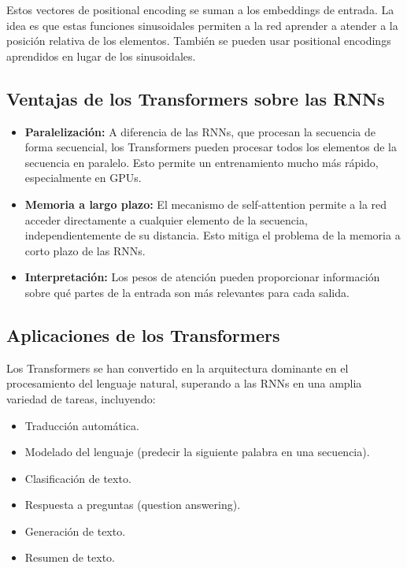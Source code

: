 \documentclass{article}
\begin{document}
Estos vectores de positional encoding se suman a los embeddings de entrada.  La idea es que estas funciones sinusoidales permiten a la red aprender a atender a la posición relativa de los elementos.  También se pueden usar positional encodings aprendidos en lugar de los sinusoidales.

\subsection{Ventajas de los Transformers sobre las RNNs}

\begin{itemize}
    \item \textbf{Paralelización:}  A diferencia de las RNNs, que procesan la secuencia de forma secuencial, los Transformers pueden procesar todos los elementos de la secuencia en paralelo.  Esto permite un entrenamiento mucho más rápido, especialmente en GPUs.
    \item \textbf{Memoria a largo plazo:}  El mecanismo de self-attention permite a la red acceder directamente a cualquier elemento de la secuencia, independientemente de su distancia.  Esto mitiga el problema de la memoria a corto plazo de las RNNs.
    \item \textbf{Interpretación:}  Los pesos de atención pueden proporcionar información sobre qué partes de la entrada son más relevantes para cada salida.
\end{itemize}

\subsection{Aplicaciones de los Transformers}

Los Transformers se han convertido en la arquitectura dominante en el procesamiento del lenguaje natural, superando a las RNNs en una amplia variedad de tareas, incluyendo:

\begin{itemize}
    \item Traducción automática.
    \item Modelado del lenguaje (predecir la siguiente palabra en una secuencia).
    \item Clasificación de texto.
    \item Respuesta a preguntas (question answering).
    \item Generación de texto.
    \item Resumen de texto.
\end{itemize}
\end{document}
